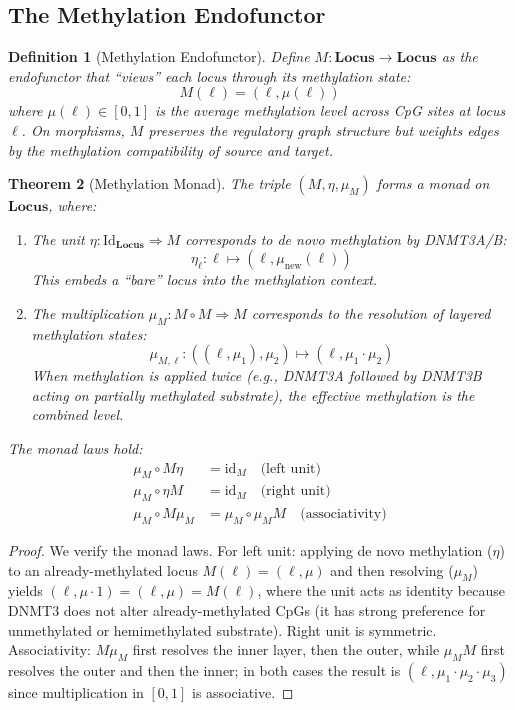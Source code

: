 \documentclass[12pt,a4paper]{article}
\newtheorem{theorem}{Theorem}[section]
\newtheorem{definition}[theorem]{Definition}
\newcommand{\eg}{\textit{e.g.}}
\newcommand{\cat}[1]{\mathbf{#1}}
\newcommand{\id}{\mathrm{id}}
\begin{document}
\subsection{The Methylation Endofunctor}

\begin{definition}[Methylation Endofunctor]
\label{def:meth-endo}
Define $M : \cat{Locus} \to \cat{Locus}$ as the endofunctor that ``views'' each locus through its methylation state:
\[
    M(\ell) = (\ell, \mu(\ell))
\]
where $\mu(\ell) \in [0,1]$ is the average methylation level across CpG sites at locus $\ell$. On morphisms, $M$ preserves the regulatory graph structure but weights edges by the methylation compatibility of source and target.
\end{definition}

\begin{theorem}[Methylation Monad]
\label{thm:meth-monad}
The triple $(M, \eta, \mu_M)$ forms a monad on $\cat{Locus}$, where:
\begin{enumerate}[label=(\roman*)]
    \item The \emph{unit} $\eta : \mathrm{Id}_{\cat{Locus}} \Rightarrow M$ corresponds to \emph{de novo} methylation by DNMT3A/B:
    \[
        \eta_\ell : \ell \mapsto (\ell, \mu_{\mathrm{new}}(\ell))
    \]
    This embeds a ``bare'' locus into the methylation context.

    \item The \emph{multiplication} $\mu_M : M \circ M \Rightarrow M$ corresponds to the resolution of layered methylation states:
    \[
        \mu_{M,\ell} : ((\ell, \mu_1), \mu_2) \mapsto (\ell, \mu_1 \cdot \mu_2)
    \]
    When methylation is applied twice (\eg, DNMT3A followed by DNMT3B acting on partially methylated substrate), the effective methylation is the combined level.
\end{enumerate}
The monad laws hold:
\begin{align}
    \mu_M \circ M\eta &= \id_M \quad \text{(left unit)} \\
    \mu_M \circ \eta M &= \id_M \quad \text{(right unit)} \\
    \mu_M \circ M\mu_M &= \mu_M \circ \mu_M M \quad \text{(associativity)}
\end{align}
\end{theorem}

\begin{proof}
We verify the monad laws. For left unit: applying de novo methylation ($\eta$) to an already-methylated locus $M(\ell) = (\ell, \mu)$ and then resolving ($\mu_M$) yields $(\ell, \mu \cdot 1) = (\ell, \mu) = M(\ell)$, where the unit acts as identity because DNMT3 does not alter already-methylated CpGs (it has strong preference for unmethylated or hemimethylated substrate). Right unit is symmetric. Associativity: $M\mu_M$ first resolves the inner layer, then the outer, while $\mu_M M$ first resolves the outer and then the inner; in both cases the result is $(\ell, \mu_1 \cdot \mu_2 \cdot \mu_3)$ since multiplication in $[0,1]$ is associative.
\end{proof}
\end{document}

